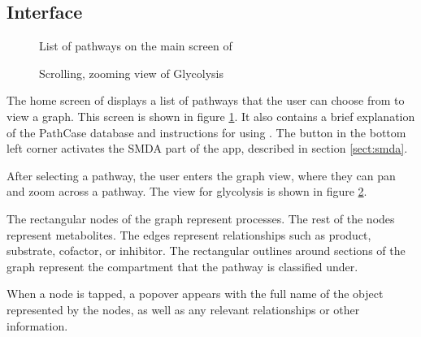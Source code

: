 \subsection{Interface}
\label{sect:maw_interface}

\begin{figure}[htb]
    \center{
        \texttt{[image: maw/figures/screenshot\_list]}}
    \caption{\label{fig:maw_screenshot_list} List of pathways on the main screen
    of \mawapp}
\end{figure}

\begin{figure}[hbt]
    \caption{\label{fig:maw_screenshot_pathway} Scrolling, zooming view of
    Glycolysis}
\end{figure}

The home screen of \mawapp displays a list of pathways that the user can
choose from to view a graph. This screen is shown in figure
\ref{fig:maw_screenshot_list}. It also contains a brief explanation of the
PathCase database and instructions for using \mawapp. The button in the bottom
left corner activates the SMDA part of the app, described in section
\ref{sect:smda}.

After selecting a pathway, the user enters the graph view, where they can pan
and zoom across a pathway. The view for glycolysis is shown in figure
\ref{fig:maw_screenshot_pathway}.

The rectangular nodes of the graph represent processes. The rest of the nodes
represent metabolites. The edges represent relationships such as product,
substrate, cofactor, or inhibitor. The rectangular outlines around sections of
the graph represent the compartment that the pathway is classified under.

When a node is tapped, a popover appears with the full name of the object
represented by the nodes, as well as any relevant relationships or other
information.

